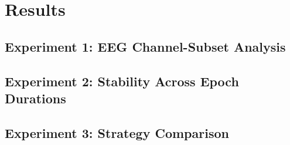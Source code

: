 \section{Results}
\label{sec:results}



\subsection{Experiment 1: EEG Channel-Subset Analysis}
\label{sec:exp1_channel}



\subsection{Experiment 2: Stability Across Epoch Durations}
\label{sec:exp3_epoch}





% 




\subsection{Experiment 3: Strategy Comparison}
\label{sec:exp3_strategy}




